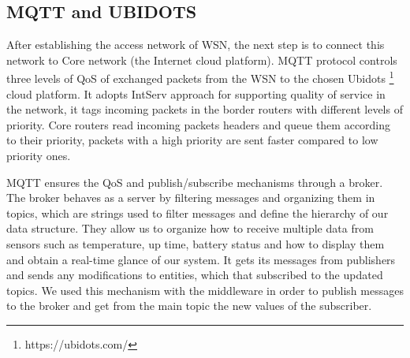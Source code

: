 \documentclass[conference]{../../setup/IEEEtran}
\begin{document}






\subsection{MQTT and UBIDOTS} \label{Sec:MQTT}

After establishing the access network of WSN, the next step is to connect this network to Core network (the Internet cloud platform). MQTT protocol controls three levels of QoS of exchanged packets from the WSN to the chosen Ubidots \footnote{https://ubidots.com/} cloud platform. It adopts IntServ approach for supporting quality of service in the network,
	it tags incoming packets in the border routers with different levels of priority.
Core routers read incoming packets headers and queue them according to their priority,
	packets with a high priority are sent faster compared to low priority ones.

MQTT ensures the QoS and publish/subscribe mechanisms through a broker. The broker behaves as a server by filtering messages and organizing them in topics, which are strings used to filter messages and define the hierarchy of our data structure. 
They allow us to organize how to receive multiple data from sensors such as temperature, up time, battery status and how to display them and obtain a real-time glance of our system.  It gets its messages from publishers and sends any modifications to entities, which that subscribed to the updated topics. We used this mechanism with the middleware in order to publish messages to the broker and get from the main topic the new values of the subscriber.
\end{document}
